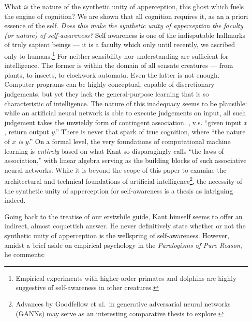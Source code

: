 What \emph{is} the nature of the synthetic unity of apperception, this ghost which fuels the engine of cognition? We are shown that all cognition requires it, as an a priori essence of the self. \emph{Does this make the synthetic unity of apperception the faculty (or nature) of self-awareness?} Self awareness is one of the indisputable hallmarks of truly sapient beings --- it is a faculty which only until recently, we ascribed only to humans.\footnote{Empirical experiments with higher-order primates and dolphins are highly suggestive of self-awareness in other creatures.} For neither sensibility nor understanding are sufficient for intelligence. The former is within the domain of all sensate creatures --- from plants, to insects, to clockwork automata. Even the latter is not enough. Computer programs can be highly conceptual, capable of discretionary judgements, but yet they lack the general-purpose learning that is so characteristic of intelligence. The nature of this inadequacy seems to be plausible: while an artificial neural network is able to execute judgements on input, all such judgement takes the unwieldy form of contingent association. , v.s. \enquote{given input \(x\), return output \(y\).} There is never that spark of true cognition, where \enquote{the nature of \(x\) \emph{is} \(y\).} On a formal level, the very foundations of computational machine learning is \emph{entirely} based on what Kant so disparagingly calls \enquote{the laws of association,} with linear algebra serving as the building blocks of such associative neural networks. While it is beyond the scope of this paper to examine the architectural and technical foundations of artificial intelligence\footnote{Advances by Goodfellow et al.\ in generative adversarial neural networks (GANNs) may serve as an interesting comparative thesis to explore.}, the necessity of the synthetic unity of apperception for self-awareness is a thesis as intriguing indeed.

\noindent
Going back to the treatise of our erstwhile guide, Kant himself seems to offer an indirect, almost coquettish answer. He never definitively state whether or not the synthetic unity of apperception is the wellspring of self-awareness. However, amidst a brief aside on empirical psychology in the \emph{Paralogisms of Pure Reason}, he comments:

